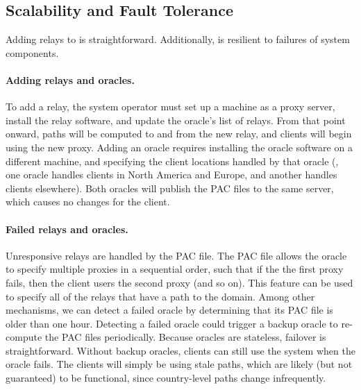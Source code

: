 \subsection{Scalability and Fault Tolerance}
Adding relays to \system{} is 
straightforward. Additionally, \system{} is resilient to failures of system components.

\paragraph{Adding relays and oracles.} To add a relay, the system
operator must set up a machine as a proxy server, install the relay
software, and update the oracle's list of relays.  From that point
onward, paths will be computed to and from the new relay, and clients
will begin using the new proxy.  Adding an oracle requires installing
the oracle software on a different machine, and specifying the client
locations handled by that oracle (\eg, one oracle handles clients in
North America and Europe, and another handles clients elsewhere).
Both oracles will publish the PAC files to the same server, which
causes no changes for the client.

\paragraph{Failed relays and oracles.} Unresponsive relays are handled
by the PAC file.  The PAC file allows the oracle to specify multiple
proxies in a sequential order, such that if the the first proxy fails,
then the client users the second proxy (and so on).  This feature can
be used to specify all of the relays that have a path to the domain.
Among other mechanisms, we can detect a failed oracle by determining
that its PAC file is older than one hour.  Detecting a failed oracle
could trigger a backup oracle to re-compute the PAC files
periodically.  Because oracles are stateless, failover is
straightforward.  Without backup oracles, clients can still use the
system when the oracle fails.  The clients will simply be using stale
paths, which are likely (but not guaranteed) to be functional, since
country-level paths change infrequently.



